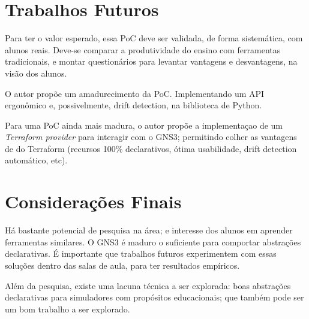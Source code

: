 \documentclass[12pt]{article}
\begin{document}
\section{Trabalhos Futuros}

Para ter o valor esperado, essa PoC deve ser validada, de forma sistemática,
com alunos reais. Deve-se comparar a produtividade do ensino com ferramentas
tradicionais, e montar questionários para levantar vantagens e desvantagens, na
visão dos alunos.

O autor propõe um amadurecimento da PoC. Implementando um API ergonômico e,
possivelmente, drift detection, na biblioteca de Python.

Para uma PoC ainda mais madura, o autor propõe a implementaçao de um
\textit{Terraform provider} para interagir com o GNS3; permitindo colher as
vantagens de do Terraform (recursos 100\% declarativos, ótima usabilidade,
drift detection automático, etc).

\section{Considerações Finais}

Há bastante potencial de pesquisa na área; e interesse dos alunos em aprender
ferramentas similares. O GNS3 é maduro o suficiente para comportar abstrações
declarativas. É importante que trabalhos futuros experimentem com essas
soluções dentro das salas de aula, para ter resultados empíricos.

Além da pesquisa, existe uma lacuna técnica a ser explorada: boas abstrações
declarativas para simuladores com propósitos educacionais; que também pode ser
um bom trabalho a ser explorado.



\end{document}
